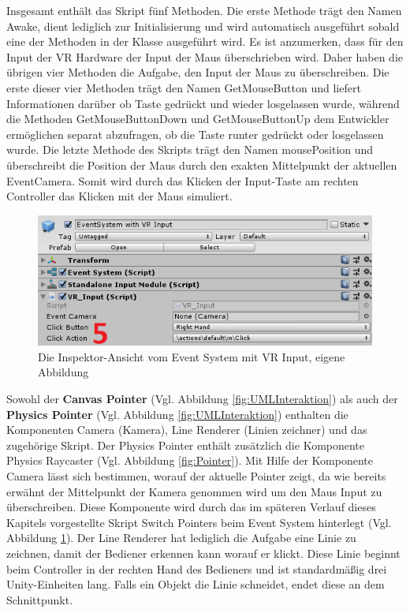 Insgesamt enthält das Skript fünf Methoden. Die erste Methode trägt den Namen Awake, dient lediglich zur Initialisierung und wird automatisch ausgeführt sobald eine der Methoden in der Klasse ausgeführt wird. Es ist anzumerken, dass für den Input der VR Hardware der Input der Maus überschrieben wird. Daher haben die übrigen vier Methoden die Aufgabe, den Input der Maus zu überschreiben. Die erste dieser vier Methoden trägt den Namen GetMouseButton und liefert Informationen darüber ob Taste gedrückt und wieder losgelassen wurde, während die Methoden GetMouseButtonDown und GetMouseButtonUp dem Entwickler ermöglichen separat abzufragen, ob die Taste runter gedrückt oder losgelassen wurde. Die letzte Methode des Skripts trägt den Namen mousePosition und überschreibt die Position der Maus durch den exakten Mittelpunkt der aktuellen EventCamera. Somit wird durch das Klicken der Input-Taste am rechten Controller das Klicken mit der Maus simuliert.
\begin{figure}[h]
	\centering
	\includegraphics[width=0.5\linewidth]{Bilder/A41_EventSystem2}
	\caption{Die Inspektor-Ansicht vom Event System mit VR Input, eigene Abbildung}
	\label{fig:EventSystem}
\end{figure}
\newline
Sowohl der \textbf{Canvas Pointer} (Vgl. Abbildung \ref{fig:UMLInteraktion}) als auch der \textbf{Physics Pointer} (Vgl. Abbildung \ref{fig:UMLInteraktion}) enthalten die Komponenten Camera (Kamera), Line Renderer (Linien zeichner) und das zugehörige Skript. Der Physics Pointer enthält zusätzlich die Komponente Physics Raycaster (Vgl. Abbildung \ref{fig:Pointer}). Mit Hilfe der Komponente Camera lässt sich bestimmen, worauf der aktuelle Pointer zeigt, da wie bereits erwähnt der Mittelpunkt der Kamera genommen wird um den Maus Input zu überschreiben. Diese Komponente wird durch das im späteren Verlauf dieses Kapitels vorgestellte Skript Switch Pointers beim Event System hinterlegt (Vgl. Abbildung \ref{fig:EventSystem}). Der Line Renderer hat lediglich die Aufgabe eine Linie zu zeichnen, damit der Bediener erkennen kann worauf er klickt. Diese Linie beginnt beim Controller in der rechten Hand des Bedieners und ist standardmäßig drei Unity-Einheiten lang. Falls ein Objekt die Linie schneidet, endet diese an dem Schnittpunkt. 
